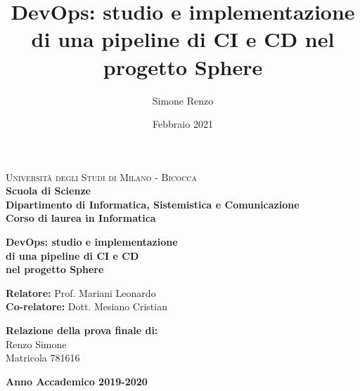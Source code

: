 \documentclass[a4paper,12pt]{report}
\title{DevOps: studio e implementazione di una pipeline di CI e CD nel progetto Sphere}
\author{Simone Renzo}
\date{Febbraio 2021}
\begin{document}
	
	\begin{titlepage}
		\noindent
		\begin{minipage}[t]{0.19\textwidth}
		\end{minipage}
		\begin{minipage}[t]{0.81\textwidth}
			{
				{\textsc{Università degli Studi di Milano - Bicocca}} \\
				\textbf{Scuola di Scienze} \\
				\textbf{Dipartimento di Informatica, Sistemistica e Comunicazione} \\
				\textbf{Corso di laurea in Informatica} \\
				\par
			}
		\end{minipage}
		
		\vspace{40mm}
		
		\begin{center}
			{\LARGE{
					\textbf{DevOps: studio e implementazione \\ di una pipeline di CI e CD \\ nel progetto Sphere}
					\par
			}}
		\end{center}
		
		\vspace{40mm}
		
		\noindent
		{\large \textbf{Relatore:} Prof. Mariani Leonardo} \\
		
		\noindent
		{\large \textbf{Co-relatore:} Dott. Mesiano Cristian}
		
		\vspace{15mm}
		
		\begin{flushright}
			{\large \textbf{Relazione della prova finale di:}} \\
			\large{Renzo Simone} \\
			\large{Matricola 781616} 
		\end{flushright}
		
		\vspace{40mm}
		\begin{center}
			{\large{\bf Anno Accademico 2019-2020}}
		\end{center}
		
		\restoregeometry
		
	\end{titlepage}
	
\end{document}

